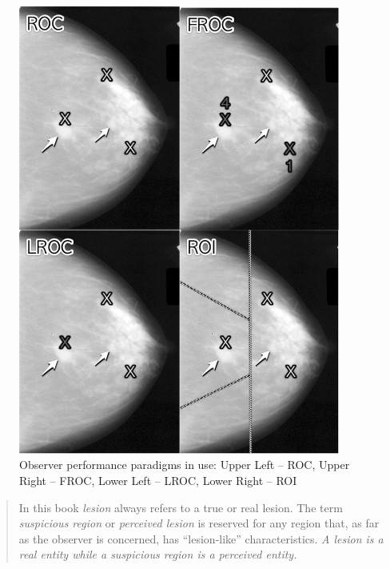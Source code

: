 \documentclass[
]{book}
\begin{document}
\begin{figure}

{\centering \includegraphics[width=300pt]{images/4Paradigms} 

}

\caption{Observer performance paradigms in use: Upper Left -- ROC, Upper Right -- FROC, Lower Left -- LROC, Lower Right -- ROI}\label{fig:froc-paradigm-4}
\end{figure}

\begin{quote}
In this book \emph{lesion} always refers to a true or real lesion. The term \emph{suspicious region} or \emph{perceived lesion} is reserved for any region that, as far as the observer is concerned, has ``lesion-like'' characteristics. \emph{A lesion is a real entity while a suspicious region is a perceived entity.}
\end{quote}
\end{document}
